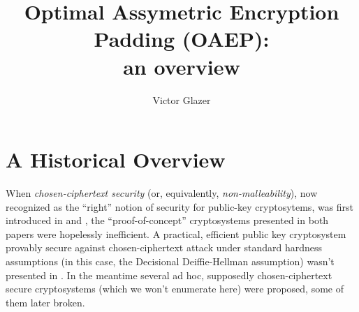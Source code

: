 \documentclass[12pt,twoside]{article}
\title{Optimal Assymetric Encryption Padding (OAEP):\\ an overview}
\author{Victor Glazer}
\begin{document}
\maketitle

\section{A Historical Overview}
When {\it chosen-ciphertext security} (or, equivalently, {\it
non-malleability}), now recognized as the ``right'' notion of
security for public-key cryptosytems, was first introduced in 
\cite{rackoff:chosenciphertext} and \cite{dolev:nonmalleable}, 
the ``proof-of-concept'' cryptosystems presented in both papers were hopelessly 
inefficient. A practical, efficient public key cryptosystem provably secure 
against chosen-ciphertext attack under standard hardness assumptions (in this 
case, the Decisional Deiffie-Hellman assumption) wasn't presented in 
\cite{cramer:cca2secure}. In the meantime several ad hoc, supposedly 
chosen-ciphertext secure cryptosystems (which we won't enumerate here) were 
proposed, some of them later broken.



\end{document}
